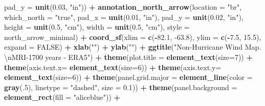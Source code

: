 \documentclass[12pt,twoside]{reedthesis}
\newenvironment{Shaded}{\begin{snugshade}}{\end{snugshade}}
\newcommand{\CharTok}[1]{\textcolor[rgb]{0.31,0.60,0.02}{#1}}
\newcommand{\DataTypeTok}[1]{\textcolor[rgb]{0.13,0.29,0.53}{#1}}
\newcommand{\DecValTok}[1]{\textcolor[rgb]{0.00,0.00,0.81}{#1}}
\newcommand{\FloatTok}[1]{\textcolor[rgb]{0.00,0.00,0.81}{#1}}
\newcommand{\KeywordTok}[1]{\textcolor[rgb]{0.13,0.29,0.53}{\textbf{#1}}}
\newcommand{\NormalTok}[1]{#1}
\newcommand{\OperatorTok}[1]{\textcolor[rgb]{0.81,0.36,0.00}{\textbf{#1}}}
\newcommand{\OtherTok}[1]{\textcolor[rgb]{0.56,0.35,0.01}{#1}}
\newcommand{\StringTok}[1]{\textcolor[rgb]{0.31,0.60,0.02}{#1}}
\begin{document}
\begin{Shaded}
\begin{Highlighting}[]
   \DataTypeTok{pad_y =} \KeywordTok{unit}\NormalTok{(}\FloatTok{0.03}\NormalTok{, }\StringTok{"in"}\NormalTok{)) }\OperatorTok{+}\StringTok{ }
\StringTok{  }\KeywordTok{annotation_north_arrow}\NormalTok{(}\DataTypeTok{location =} \StringTok{"br"}\NormalTok{, }\DataTypeTok{which_north =} \StringTok{"true"}\NormalTok{, }\DataTypeTok{pad_x =} \KeywordTok{unit}\NormalTok{(}\FloatTok{0.01}\NormalTok{, }\StringTok{"in"}\NormalTok{), }\DataTypeTok{pad_y =} \KeywordTok{unit}\NormalTok{(}\FloatTok{0.02}\NormalTok{, }\StringTok{"in"}\NormalTok{), }\DataTypeTok{height =} \KeywordTok{unit}\NormalTok{(}\FloatTok{0.5}\NormalTok{, }\StringTok{"cm"}\NormalTok{), }
   \DataTypeTok{width =} \KeywordTok{unit}\NormalTok{(}\FloatTok{0.5}\NormalTok{, }\StringTok{"cm"}\NormalTok{), }\DataTypeTok{style =}\NormalTok{ north_arrow_minimal) }\OperatorTok{+}
\StringTok{  }\KeywordTok{coord_sf}\NormalTok{(}\DataTypeTok{xlim =} \KeywordTok{c}\NormalTok{(}\OperatorTok{-}\FloatTok{82.1}\NormalTok{, }\FloatTok{-63.8}\NormalTok{), }\DataTypeTok{ylim =} \KeywordTok{c}\NormalTok{(}\OperatorTok{-}\FloatTok{7.5}\NormalTok{, }\FloatTok{15.5}\NormalTok{), }\DataTypeTok{expand =} \OtherTok{FALSE}\NormalTok{) }\OperatorTok{+}
\StringTok{  }\KeywordTok{xlab}\NormalTok{(}\StringTok{""}\NormalTok{) }\OperatorTok{+}\StringTok{ }
\StringTok{  }\KeywordTok{ylab}\NormalTok{(}\StringTok{""}\NormalTok{) }\OperatorTok{+}\StringTok{ }
\StringTok{  }\KeywordTok{ggtitle}\NormalTok{(}\StringTok{"Non-Hurricane Wind Map. }\CharTok{\textbackslash{}n}\StringTok{MRI-1700 years - ERA5"}\NormalTok{) }\OperatorTok{+}\StringTok{ }
\StringTok{  }\KeywordTok{theme}\NormalTok{(}\DataTypeTok{plot.title =} \KeywordTok{element_text}\NormalTok{(}\DataTypeTok{size=}\DecValTok{7}\NormalTok{)) }\OperatorTok{+}
\StringTok{  }\KeywordTok{theme}\NormalTok{(}\DataTypeTok{axis.text.x=} \KeywordTok{element_text}\NormalTok{(}\DataTypeTok{size=}\DecValTok{6}\NormalTok{)) }\OperatorTok{+}\StringTok{ }
\StringTok{  }\KeywordTok{theme}\NormalTok{(}\DataTypeTok{axis.text.y=} \KeywordTok{element_text}\NormalTok{(}\DataTypeTok{size=}\DecValTok{6}\NormalTok{)) }\OperatorTok{+}
\StringTok{  }\KeywordTok{theme}\NormalTok{(}\DataTypeTok{panel.grid.major =} \KeywordTok{element_line}\NormalTok{(}\DataTypeTok{color =} \KeywordTok{gray}\NormalTok{(.}\DecValTok{5}\NormalTok{), }\DataTypeTok{linetype =} \StringTok{"dashed"}\NormalTok{, }\DataTypeTok{size =} \FloatTok{0.1}\NormalTok{)) }\OperatorTok{+}
\StringTok{  }\KeywordTok{theme}\NormalTok{(}\DataTypeTok{panel.background =} \KeywordTok{element_rect}\NormalTok{(}\DataTypeTok{fill =} \StringTok{"aliceblue"}\NormalTok{)) }\OperatorTok{+}

\end{Highlighting}
\end{Shaded}
\end{document}

